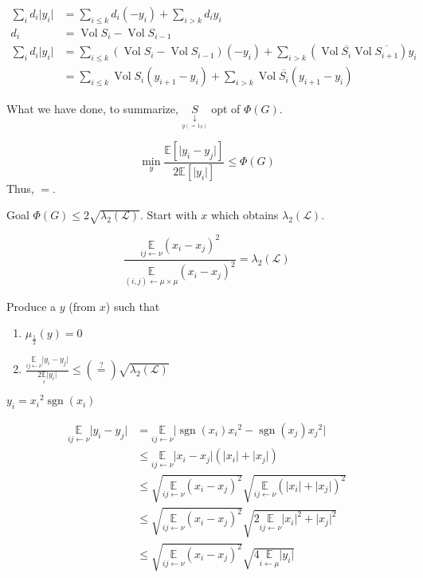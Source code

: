\documentclass[12pt]{article}
\newcommand{\EE}{\mathbb{E}}
\renewcommand{\L}{\mathcal{L}}
\newcommand{\la}{\leftarrow}
\newcommand{\esp}[2][]{\underset{#1}{\EE}\left[ #2 \right]}
\DeclareMathOperator{\vol}{Vol}
\DeclareMathOperator{\sgn}{sgn}
\begin{document}
\[
    \begin{aligned}
        \sum\limits_i d_i\lvert y_i \rvert &= \sum\limits_{i\leqslant k} d_i(-y_i) + \sum\limits_{i > k}d_i y_i\\
       d_i &= \vol S_i - \vol S_{i-1}\\
       \sum\limits_i d_i\lvert y_i \rvert &= \sum\limits_{i\leqslant k} (\vol S_i - \vol S_{i-1})(-y_i) + \sum\limits_{i>k} \left(\vol \overline{S_i} \vol \overline{S_{i+1}} \right)y_i\\
       &= \sum\limits_{i\leqslant k} \vol S_i (y_{i+1} -y_i) + \sum\limits_{i>k} \vol \overline{S_i} (y_{i+1} - y_i)
    \end{aligned}
\]

What we have done, to summarize, $\underset{\underset{y(=1_S)}{\downarrow}}{S}$ opt of $\Phi(G)$.

\[
    \min\limits_y \frac{\esp{\lvert y_i-y_j\rvert}}{2\esp{\lvert y_i \rvert}} \leqslant \Phi(G)
\]
Thus, $=$.

Goal $\Phi(G) \leqslant 2\sqrt{\lambda_2(\L)}$. Start with $x$ which obtains $\lambda_2(\L)$.

\[
    \frac{\underset{ij\la \nu}{\EE}(x_i-x_j)^2}{\underset{(i,j)\la\mu\times\mu}{\EE}(x_i-x_j)^2} = \lambda_2(\L)
\]

Produce a $y$ (from $x$) such that
\begin{enumerate}[(1)]
    \item $\mu_{\frac{1}{2}}(y) = 0$
    \item $\frac{\underset{ij\la\nu}{\EE}\lvert y_i-y_j\rvert}{2\underset{i}{\EE}\lvert y_i \rvert} \leqslant (\overset{?}{=}) \sqrt{\lambda_2(\L)}$
\end{enumerate}

$y_i = {x_i}^2 \sgn(x_i)$

\[
    \begin{aligned}
        \underset{ij\la\nu}{\EE} \lvert y_i - y_j \rvert &= \underset{ij \la \nu}{\EE} \lvert \sgn(x_i){x_i}^2 - \sgn(x_j){x_j}^2\rvert\\
        &\leqslant \underset{ij\la \nu}{\EE} \lvert x_i-x_j \rvert(\lvert x_i \rvert + \lvert x_j \rvert)\\
        &\leqslant \sqrt{\underset{ij\la\nu}{\EE}(x_i-x_j)^2} \sqrt{\underset{ij\la \nu}{\EE} (\lvert x_i \rvert + \lvert x_j \rvert)^2}\\
        &\leqslant \sqrt{\underset{ij\la\nu}{\EE}(x_i-x_j)^2} \sqrt{2\underset{ij\la \nu}{\EE} \lvert x_i \rvert^2 + \lvert x_j \rvert^2}\\
        &\leqslant \sqrt{\underset{ij\la\nu}{\EE}(x_i-x_j)^2} \sqrt{4\underset{i\la \mu}{\EE} \lvert y_i \rvert}
    \end{aligned}
\]
\end{document}
